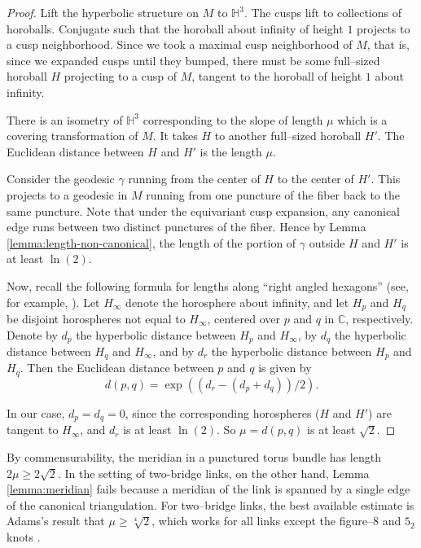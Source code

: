 \documentclass[11pt]{amsart}
\newcommand{\HH}{{\mathbb{H}}}
\newcommand{\CC}{{\mathbb{C}}}
\theoremstyle{plain}
\theoremstyle{definition}
\begin{document}
\begin{proof}
Lift the hyperbolic structure on $M$ to $\HH^3$.  The cusps lift to
collections of horoballs.  Conjugate such that the horoball about
infinity of height $1$ projects to a cusp neighborhood.  Since we took
a maximal cusp neighborhood of $M$, that is, since we expanded cusps
until they bumped, there must be some full--sized horoball $H$
projecting to a cusp of $M$, tangent to the horoball of height $1$
about infinity.

There is an isometry of $\HH^3$ corresponding to the slope of length
$\mu$ which is a covering transformation of $M$.  It takes $H$ to
another full--sized horoball $H'$.  The Euclidean distance between $H$
and $H'$ is the length $\mu$.

Consider the geodesic $\gamma$ running from the center of $H$ to the
center of $H'$.  This projects to a geodesic in $M$ running from one
puncture of the fiber back to the same puncture.  Note that under the
equivariant cusp expansion, any canonical edge runs between two
distinct punctures of the fiber.  Hence by Lemma
\ref{lemma:length-non-canonical}, the length of the portion of
$\gamma$ outside $H$ and $H'$ is at least $\ln(2)$.

Now, recall the following formula for lengths along ``right angled
hexagons'' (see, for example, \cite[Lemma 3.4]{gmm:smallest-cusped}).  
Let $H_\infty$ denote the horosphere about infinity, and
let $H_p$ and $H_q$ be disjoint horospheres not equal to $H_\infty$,
centered over $p$ and $q$ in $\CC$, respectively.  Denote by $d_p$ the
hyperbolic distance between $H_p$ and $H_\infty$, by $d_q$ the
hyperbolic distance between $H_q$ and $H_\infty$, and by $d_r$ the
hyperbolic distance between $H_p$ and $H_q$.  Then the Euclidean
distance between $p$ and $q$ is given by
\begin{equation}
d(p,q) = \exp( (d_r - (d_p+d_q))/2 ).
\label{eqn:right-hex}
\end{equation}

In our case, $d_p = d_q = 0$, since the corresponding horospheres ($H$
and $H'$) are tangent to $H_\infty$, and $d_r$ is at least $\ln(2)$.
So $\mu = d(p,q)$ is at least $\sqrt{2}$.
\end{proof}

By commensurability, the meridian in a punctured torus bundle has
length $2 \mu \geq 2 \sqrt{2}$.  In the setting of two-bridge links,
on the other hand, Lemma \ref{lemma:meridian} fails because a meridian
of the link is spanned by a single edge of the canonical
triangulation. For two--bridge links, the best available estimate is
Adams's result that $\mu \geq \sqrt[4]{2}$, which works for all links
except the figure--8 and $5_2$ knots \cite{adams:waist2}.
\end{document}
